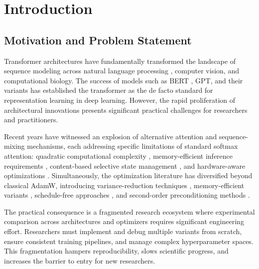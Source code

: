 \documentclass[11pt,a4paper]{article}
\begin{document}
\section{Introduction}

\subsection{Motivation and Problem Statement}

Transformer architectures have fundamentally transformed the landscape of sequence modeling across natural language processing \citep{vaswani_attention_2017}, computer vision, and computational biology. The success of models such as BERT \citep{devlin_bert_2019}, GPT, and their variants has established the transformer as the de facto standard for representation learning in deep learning. However, the rapid proliferation of architectural innovations presents significant practical challenges for researchers and practitioners.

Recent years have witnessed an explosion of alternative attention and sequence-mixing mechanisms, each addressing specific limitations of standard softmax attention: quadratic computational complexity \citep{child_sparse_transformer_2019}, memory-efficient inference requirements \citep{sun_retentive_2023,gu_mamba_2023}, content-based selective state management \citep{behrouz_titans_2025}, and hardware-aware optimizations \citep{ramapuram_theory_2024}. Simultaneously, the optimization literature has diversified beyond classical AdamW, introducing variance-reduction techniques \citep{xie_adan_2022,pagliardini_ademamix_2024,yuan_mars_2024}, memory-efficient variants \citep{shazeer_adafactor_2018,zhao_galore_2024}, schedule-free approaches \citep{defazio_road_2024}, and second-order preconditioning methods \citep{gupta_shampoo_2018,vyas_soap_2024}.

The practical consequence is a fragmented research ecosystem where experimental comparison across architectures and optimizers requires significant engineering effort. Researchers must implement and debug multiple variants from scratch, ensure consistent training pipelines, and manage complex hyperparameter spaces. This fragmentation hampers reproducibility, slows scientific progress, and increases the barrier to entry for new researchers.
\end{document}
